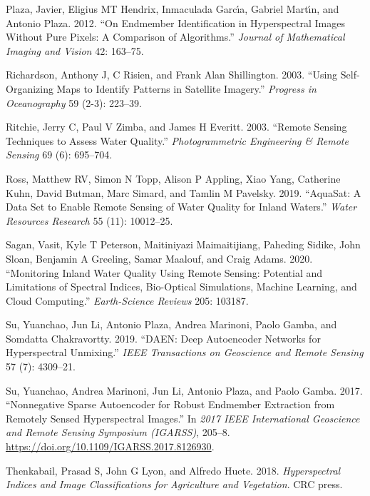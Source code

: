 \documentclass[
  letterpaper,
  DIV=11,
  numbers=noendperiod]{scrartcl}
\newlength{\cslhangindent}
\newenvironment{CSLReferences}[2] %
 {\begin{list}{}{%
  \setlength{\itemindent}{0pt}
  \setlength{\leftmargin}{0pt}
  \setlength{\parsep}{0pt}
  \ifodd #1
   \setlength{\leftmargin}{\cslhangindent}
   \setlength{\itemindent}{-1\cslhangindent}
  \fi
  \setlength{\itemsep}{#2\baselineskip}}}
 {\end{list}}
\begin{document}
\begin{CSLReferences}{1}{0}
Plaza, Javier, Eligius MT Hendrix, Inmaculada Garcı́a, Gabriel Martı́n,
and Antonio Plaza. 2012. {``On Endmember Identification in Hyperspectral
Images Without Pure Pixels: A Comparison of Algorithms.''} \emph{Journal
of Mathematical Imaging and Vision} 42: 163--75.

Richardson, Anthony J, C Risien, and Frank Alan Shillington. 2003.
{``Using Self-Organizing Maps to Identify Patterns in Satellite
Imagery.''} \emph{Progress in Oceanography} 59 (2-3): 223--39.

Ritchie, Jerry C, Paul V Zimba, and James H Everitt. 2003. {``Remote
Sensing Techniques to Assess Water Quality.''} \emph{Photogrammetric
Engineering \& Remote Sensing} 69 (6): 695--704.

Ross, Matthew RV, Simon N Topp, Alison P Appling, Xiao Yang, Catherine
Kuhn, David Butman, Marc Simard, and Tamlin M Pavelsky. 2019.
{``AquaSat: A Data Set to Enable Remote Sensing of Water Quality for
Inland Waters.''} \emph{Water Resources Research} 55 (11): 10012--25.

Sagan, Vasit, Kyle T Peterson, Maitiniyazi Maimaitijiang, Paheding
Sidike, John Sloan, Benjamin A Greeling, Samar Maalouf, and Craig Adams.
2020. {``Monitoring Inland Water Quality Using Remote Sensing: Potential
and Limitations of Spectral Indices, Bio-Optical Simulations, Machine
Learning, and Cloud Computing.''} \emph{Earth-Science Reviews} 205:
103187.

Su, Yuanchao, Jun Li, Antonio Plaza, Andrea Marinoni, Paolo Gamba, and
Somdatta Chakravortty. 2019. {``DAEN: Deep Autoencoder Networks for
Hyperspectral Unmixing.''} \emph{IEEE Transactions on Geoscience and
Remote Sensing} 57 (7): 4309--21.

Su, Yuanchao, Andrea Marinoni, Jun Li, Antonio Plaza, and Paolo Gamba.
2017. {``Nonnegative Sparse Autoencoder for Robust Endmember Extraction
from Remotely Sensed Hyperspectral Images.''} In \emph{2017 IEEE
International Geoscience and Remote Sensing Symposium (IGARSS)}, 205--8.
\url{https://doi.org/10.1109/IGARSS.2017.8126930}.

Thenkabail, Prasad S, John G Lyon, and Alfredo Huete. 2018.
\emph{Hyperspectral Indices and Image Classifications for Agriculture
and Vegetation}. CRC press.


\end{CSLReferences}
\end{document}
